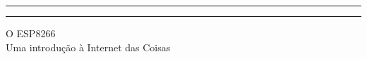 \documentclass[
	11pt,				%
	openright,			%
	twoside,			%
	a5paper,			%
	english,			%
	french,				%
	spanish,			%
	brazil,				%
	sumario=tradicional
]{abntex2}
\begin{document}
\begin{titlingpage} %
	
	\centering %
	
	
	\rule{270pt}{1pt} %
	
	\vspace{2pt}\vspace{-\baselineskip} %
	
	\rule{270pt}{0.4pt} %
	
	\vspace{0.1\textheight} %
	
	
	\textcolor{Black!80}{
	\centering%
	\hspace{10pt}	{\Huge O ESP8266}\\[0.5\baselineskip] %
	\hspace{10pt}	{\Large Uma introdução à Internet das Coisas}\\[0.5\baselineskip] %
	}
	
	\vspace{0.025\textheight} %
	
	
	\vspace{0.1\textheight} %
	
	
	
	\vfill %
	
	\vspace{10pt}
	

\end{titlingpage}
\end{document}
